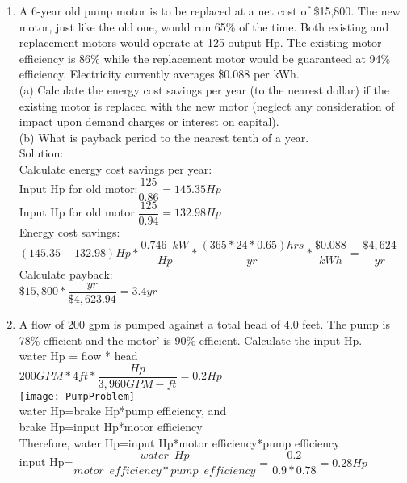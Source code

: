 \begin{enumerate}[1.]
\item A 6-year old pump motor is to be replaced at a net cost of \$15,800. The new motor, just like the old one, would run 65\% of the time. Both existing and replacement motors would operate at 125 output Hp. The existing motor efficiency is 86\% while the replacement motor would be guaranteed at 94\% efficiency. Electricity currently averages \$0.088 per kWh.\\
\vspace{0.4cm}
(a) Calculate the energy cost savings per year (to the nearest dollar) if the existing motor is replaced with the new motor (neglect any consideration of impact upon demand charges or interest on capital).\\
\vspace{0.4cm}
(b) What is payback period to the nearest tenth of a year.\\
\vspace{0.4cm}
Solution:\\
\vspace{0.4cm}
Calculate energy cost savings per year:\\
\vspace{0.4cm}
Input Hp for old motor:$\dfrac{125}{0.86}=145.35Hp$\\
\vspace{0.4cm}
Input Hp for old motor:$\dfrac{125}{0.94}=132.98Hp$\\
\vspace{0.4cm}
Energy cost savings:\\$(145.35-132.98)Hp*\dfrac{0.746 \enspace kW}{Hp}*\dfrac{(365*24*0.65)hrs}{yr}*\dfrac{\$0.088}{kWh}=\boxed{\dfrac{\$4,624}{yr}}$\\
\vspace{0.4cm}
Calculate payback:\\
\vspace{0.4cm}
$\$15,800*\dfrac{yr}{\$4,623.94}=\boxed{3.4yr}$


\item A flow of 200 gpm  is pumped against a total head of 4.0 feet. The pump is 78\% efficient and the motor' is 90\% efficient. Calculate the input Hp.\\
\vspace{0.4cm}
water Hp = flow * head\\
\vspace{0.2cm}
$200GPM*4ft*\dfrac{Hp}{3,960 GPM-ft}=0.2Hp$\\
\vspace{0.4cm}\texttt{[image: PumpProblem]}\\
water Hp=brake Hp*pump efficiency, and\\
brake Hp=input Hp*motor efficiency\\
Therefore, water Hp=input Hp*motor efficiency*pump efficiency\\
\vspace{0.4cm}
input Hp=$\dfrac{water \enspace Hp}{motor \enspace efficiency*pump \enspace efficiency}=\dfrac{0.2}{0.9*0.78}=\boxed{0.28Hp}$
\vspace{0.2cm}
\end{enumerate}






